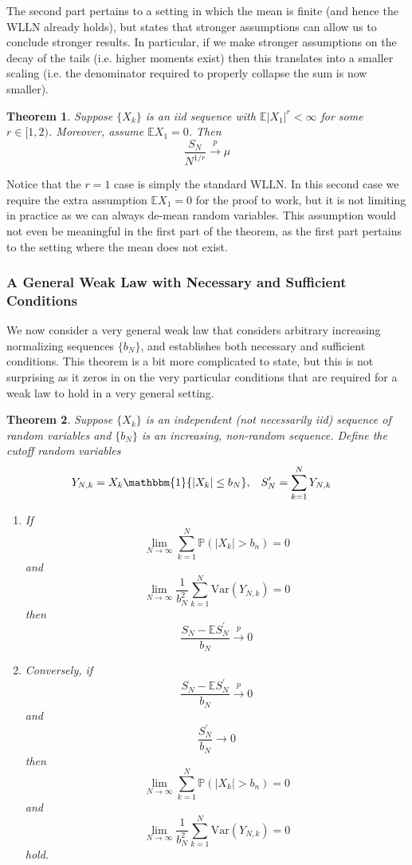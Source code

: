 \documentclass[12pt]{article}
\newcommand*{\abs}[1]{\left\lvert#1\right\rvert}
\newcommand{\E}{\mathbb{E}}
\newcommand{\Var}{\mathrm{Var}}
\newcommand{\Prob}{\mathbb{P}}
\newtheorem{thm}{Theorem}
\begin{document}
The second part pertains to a setting in which the mean is finite (and hence the WLLN already holds), but states that stronger assumptions can allow us to conclude stronger results. 
In particular, if we make stronger assumptions 
on the decay of the tails (i.e. higher moments exist) then this translates into a smaller scaling (i.e. the denominator required to properly collapse the sum is now smaller). 
\begin{thm} 
Suppose $\{X_k\}$ is an iid sequence with $\E\abs{X_1}^r < \infty$ for some $r \in [1, 2)$. Moreover, assume $\E X_1 = 0$. Then 
\[\frac{S_N}{N^{1/r}} \overset{p}{\to} \mu\]
\end{thm}
Notice that the $r = 1$ case is simply the standard WLLN. In this second case we require the extra assumption $\E X_1 = 0$ for the proof to work, but it is not limiting in practice as we can 
always de-mean random variables. This assumption would not even be meaningful in the first part of the theorem, as the first part pertains to the setting where the mean does not exist. 

\subsubsection{A General Weak Law with Necessary and Sufficient Conditions}
We now consider a very general weak law that considers arbitrary increasing normalizing sequences $\{b_N\}$, and establishes both necessary and sufficient conditions. This theorem is a bit 
more complicated to state, but this is not surprising as it zeros in on the very particular conditions that are required for a weak law to hold in a very general setting. 
\begin{thm}
Suppose $\{X_k\}$ is an independent (not necessarily iid) sequence of random variables and $\{b_N\}$ is an increasing, non-random sequence. Define the cutoff random variables 
\begin{align*}
&Y_{N, k} = X_k \mathbbm{1}\{\abs{X_k} \leq b_N\}, &&S_N^\prime = \sum_{k = 1}^{N} Y_{N, k}
\end{align*}
\begin{enumerate}
\item If
\[\lim_{N \to \infty} \sum_{k = 1}^{N} \Prob(\abs{X_k} > b_n) = 0\]
and 
\[\lim_{N \to \infty} \frac{1}{b_N^2} \sum_{k = 1}^{N} \Var(Y_{N, k}) = 0\]
then
\[\frac{S_N - \E S_N^\prime}{b_N} \overset{p}{\to} 0\]

\item Conversely, if 
\[\frac{S_N - \E S_N^\prime}{b_N} \overset{p}{\to} 0\]
and 
\[\frac{S_N^\prime}{b_N} \to 0\]
then 
\[\lim_{N \to \infty} \sum_{k = 1}^{N} \Prob(\abs{X_k} > b_n) = 0\]
and 
\[\lim_{N \to \infty} \frac{1}{b_N^2} \sum_{k = 1}^{N} \Var(Y_{N, k}) = 0\]
hold. 
\end{enumerate}
\end{thm}
\end{document}
